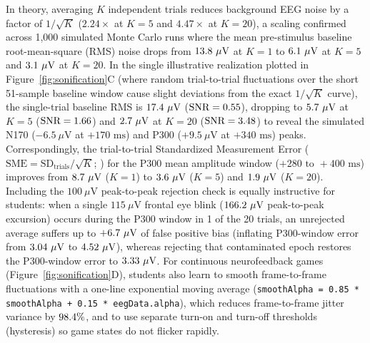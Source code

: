 \documentclass[11pt]{article}
\begin{document}
In theory, averaging $K$ independent trials reduces background EEG noise by a factor of $1/\sqrt{K}$ ($2.24\times$ at $K=5$ and $4.47\times$ at $K=20$), a scaling confirmed across 1,000 simulated Monte Carlo runs where the mean pre-stimulus baseline root-mean-square (RMS) noise drops from $13.8\ \mu\text{V}$ at $K=1$ to $6.1\ \mu\text{V}$ at $K=5$ and $3.1\ \mu\text{V}$ at $K=20$. In the single illustrative realization plotted in Figure~\ref{fig:sonification}C (where random trial-to-trial fluctuations over the short 51-sample baseline window cause slight deviations from the exact $1/\sqrt{K}$ curve), the single-trial baseline RMS is $17.4\ \mu\text{V}$ ($\text{SNR} = 0.55$), dropping to $5.7\ \mu\text{V}$ at $K=5$ ($\text{SNR} = 1.66$) and $2.7\ \mu\text{V}$ at $K=20$ ($\text{SNR} = 3.48$) to reveal the simulated N170 ($-6.5\ \mu\text{V}$ at $+170\text{ ms}$) and P300 ($+9.5\ \mu\text{V}$ at $+340\text{ ms}$) peaks. Correspondingly, the trial-to-trial Standardized Measurement Error ($\text{SME} = \text{SD}_{\text{trials}} / \sqrt{K}$; \citealp{luck2021standardized}) for the P300 mean amplitude window ($+280\text{ to }+400\text{ ms}$) improves from $8.7\ \mu\text{V}$ ($K=1$) to $3.6\ \mu\text{V}$ ($K=5$) and $1.9\ \mu\text{V}$ ($K=20$). Including the $100\ \mu\text{V}$ peak-to-peak rejection check is equally instructive for students: when a single $115\ \mu\text{V}$ frontal eye blink ($166.2\ \mu\text{V}$ peak-to-peak excursion) occurs during the P300 window in 1 of the 20 trials, an unrejected average suffers up to $+6.7\ \mu\text{V}$ of false positive bias (inflating P300-window error from $3.04\ \mu\text{V}$ to $4.52\ \mu\text{V}$), whereas rejecting that contaminated epoch restores the P300-window error to $3.33\ \mu\text{V}$. For continuous neurofeedback games (Figure~\ref{fig:sonification}D), students also learn to smooth frame-to-frame fluctuations with a one-line exponential moving average (\texttt{smoothAlpha = 0.85 * smoothAlpha + 0.15 * eegData.alpha}), which reduces frame-to-frame jitter variance by $98.4\%$, and to use separate turn-on and turn-off thresholds (hysteresis) so game states do not flicker rapidly.
\end{document}
